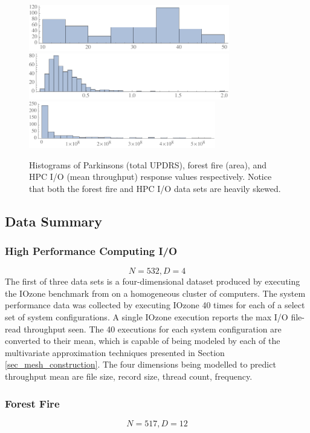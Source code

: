 \begin{figure}
  \includegraphics[width=.5\textwidth,height=2cm]{p-hist.pdf}
  \includegraphics[width=.5\textwidth,height=2cm]{f-hist.pdf}
  \includegraphics[width=.5\textwidth,height=2cm]{h-hist.pdf}
  \caption{Histograms of Parkinsons (total UPDRS), forest fire (area), and HPC I/O (mean throughput) response values respectively. Notice that both the forest fire and HPC I/O data sets are heavily skewed.
  \vspace{-.5cm}}
  \label{fig_response_hists}
\end{figure}

\subsection{Data Summary}

\subsubsection{High Performance Computing I/O}
$$N = 532, D = 4$$
The first of three data sets is a four-dimensional dataset produced by executing the IOzone benchmark from \cite{iozone} on a homogeneous cluster of computers. The system performance data was collected by executing IOzone 40 times for each of a select set of system configurations. A single IOzone execution reports the max I/O file-read throughput seen. The 40 executions for each system configuration are converted to their mean, which is capable of being modeled by each of the multivariate approximation techniques presented in Section \ref{sec_mesh_construction}. The four dimensions being modelled to predict throughput mean are file size, record size, thread count, frequency.

\subsubsection{Forest Fire}
$$N = 517, D = 12$$

